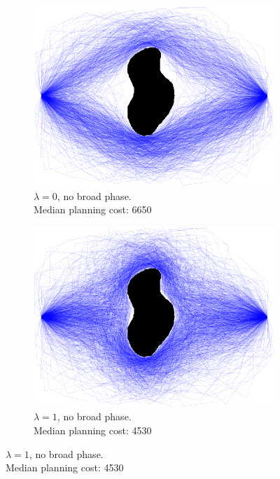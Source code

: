 \begin{figure}
\centering

\begin{subfigure}[t]{0.45\linewidth}
\centering
\includegraphics[width=\columnwidth]{figs/paths-lambda0-norel.png}
\caption{
  $\lambda=0$, no broad phase.\\
  Median planning cost: 6650}
\end{subfigure}
\begin{subfigure}[t]{0.45\linewidth}
\centering
\includegraphics[width=\columnwidth]{figs/paths-lambda1-norel.png}
\caption{
  $\lambda=1$, no broad phase.\\
  Median planning cost: 4530}
\end{subfigure}


\end{figure}
